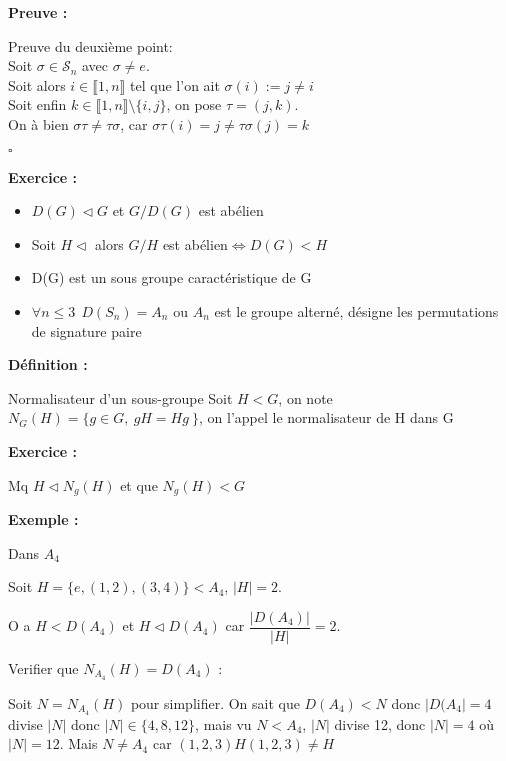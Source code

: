 \documentclass{report}
\renewenvironment{leftbar}{%
  \def\FrameCommand{\vrule width 0.4pt \hspace{10pt}}%
  \MakeFramed {\advance\hsize-\width \FrameRestore}}%
 {\endMakeFramed}%
\newenvironment{definition}[1][]{
    \begin{tcolorbox}[colframe= white]
    \textbf{Définition :} 
    #1 \par
    }
    {\end{tcolorbox}}
\newenvironment{preuve}{\vspace*{0.5cm}
    \begin{leftbar}
    \noindent\textbf{Preuve :}\par}{
    \begin{flushright}
    $\square$
    \end{flushright}
    \end{leftbar}
}
\newenvironment{exemple}{\begin{tcolorbox}[colframe= white]
    \textbf{Exemple :}
     \par}
    {\end{tcolorbox}}
\newenvironment{exo}{\begin{tcolorbox}[colframe= white]
    \textbf{Exercice :}
    \par}
    {\end{tcolorbox}}
\newcommand{\sn}{\mathcal{S}_{n}}
\begin{document}
\begin{preuve}
    Preuve du deuxième point:\\
    Soit $\sigma \in \sn$ avec $\sigma \neq e$.\\
    Soit alors $i\in \llbracket 1,n \rrbracket$ tel que l'on ait $\sigma(i):=j\neq i$\\
    Soit enfin $k\in \llbracket 1,n \rrbracket \setminus \{i,j\}$, on pose $\tau = (j,k)$.\\
    On à bien $\sigma\tau\neq\tau\sigma$, car $\sigma\tau(i)=j\neq\tau\sigma(j)=k$
\end{preuve}


\begin{exo}
    \begin{itemize}
        \item $D(G)\vartriangleleft G$ et $G/D(G)$ est abélien
        \item Soit $H \vartriangleleft$ alors $G/H$ est abélien$\Leftrightarrow D(G)<H$
        \item D(G) est un sous groupe caractéristique de G
        \item $\forall n \leq3 ~~D(S_{n})=A_{n}$ ou $A_{n}$ est le groupe alterné, désigne les permutations de signature paire
    \end{itemize}
\end{exo}

\begin{definition}{Normalisateur d'un sous-groupe}
Soit $H<G$, on note$N_{G}(H) = \{g\in G , ~gH=Hg~\}$, on l'appel le normalisateur de H dans G
\end{definition}

\begin{exo}
Mq $H\triangleleft N_{g}(H)$ et que $N_{g}(H)<G$
\end{exo}

\begin{exemple}
Dans $A_{4}$ \par
Soit $H =\{ e,(1,2),(3,4) \}<A_{4}$, $|H|=2$.  \par
O a $H<D(A_{4})$ et $H\triangleleft D(A_{4})$ car $\dfrac{|D(A_{4})|}{|H|}=2$.  \par
Verifier que $N_{A_{4}}(H)=D(A_{4})$ :  \par

Soit $N = N_{A_{4}}(H)$ pour simplifier. On sait que $D(A_{4})<N$ donc $|D(A_{4}|=4$ divise $|N|$ donc $|N|\in \{ 4,8,12 \}$, mais vu $N<A_{4}$, $|N|$ divise 12, donc $|N|=4$ où $|N|=12$. Mais $N\neq A_{4}$ car $(1,2,3)H(1,2,3)\neq H$  \par
\end{exemple}
\end{document}
